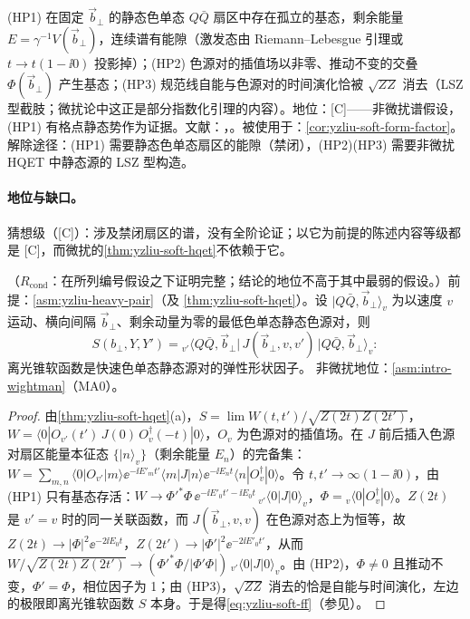 \begin{assumption}\label{asm:yzliu-heavy-pair}
(HP1) 在固定 $\vec b_\perp$ 的静态色单态 $Q\bar Q$ 扇区中存在孤立的基态，剩余能量 $E=\gamma^{-1}V(\vec b_\perp)$，连续谱有能隙（激发态由 Riemann--Lebesgue 引理或 $t\to t(1-\ii0)$ 投影掉）；(HP2) 色源对的插值场以非零、推动不变的交叠 $\Phi(\vec b_\perp)$ 产生基态；(HP3) 规范线自能与色源对的时间演化恰被 $\sqrt{ZZ}$ 消去（LSZ 型截肢；微扰论中这正是部分指数化引理的内容）。地位：[C]——非微扰谱假设，(HP1) 有格点静态势作为证据。文献：\cite{Ji:2019sxk}，\cite[第~4.1--4.2~节、附录~A]{Liu:2022nnk}。被使用于：\cref{cor:yzliu-soft-form-factor}。解除途径：(HP1) 需要静态色单态扇区的能隙（禁闭），(HP2)(HP3) 需要非微扰 HQET 中静态源的 LSZ 型构造。
\end{assumption}

\paragraph{地位与缺口。}猜想级（[C]）：涉及禁闭扇区的谱，没有全阶论证；以它为前提的陈述内容等级都是 [C]，而微扰的\cref{thm:yzliu-soft-hqet}不依赖于它。

\begin{corollary}\label{cor:yzliu-soft-form-factor}
（$R_{\mathrm{cond}}$：在所列编号假设之下证明完整；结论的地位不高于其中最弱的假设。）前提：\cref{asm:yzliu-heavy-pair}（及 \cref{thm:yzliu-soft-hqet}）。设 $|Q\bar Q,\vec b_\perp\rangle_v$ 为以速度 $v$ 运动、横向间隔 $\vec b_\perp$、剩余动量为零的最低色单态静态色源对，则
\begin{equation}\label{eq:yzliu-soft-ff}
S(b_\perp,Y,Y')={}_{v'}\big\langle Q\bar Q,\vec b_\perp\big|\,J(\vec b_\perp,v,v')\,\big|Q\bar Q,\vec b_\perp\big\rangle_v :
\end{equation}
离光锥软函数是快速色单态静态源对的弹性形状因子。%
非微扰地位：\cref{asm:intro-wightman}（MA0）。
\end{corollary}

\begin{proof}
由\cref{thm:yzliu-soft-hqet}(a)，$S=\lim W(t,t')/\sqrt{Z(2t)Z(2t')}$，$W=\langle0|O_{v'}(t')\,J(0)\,O^\dagger_v(-t)|0\rangle$，$O_v$ 为色源对的插值场。在 $J$ 前后插入色源对扇区能量本征态 $\{|n\rangle_v\}$（剩余能量 $E_n$）的完备集：$W=\sum_{m,n}\langle0|O_{v'}|m\rangle\ee^{-\ii E'_mt'}\langle m|J|n\rangle\ee^{-\ii E_nt}\langle n|O_v^\dagger|0\rangle$。令 $t,t'\to\infty(1-\ii0)$，由 (HP1) 只有基态存活：$W\to\Phi'^*\Phi\,\ee^{-\ii E'_0t'-\ii E_0t}\,{}_{v'}\langle0|J|0\rangle_v$，$\Phi={}_v\langle0|O_v^\dagger|0\rangle$。$Z(2t)$ 是 $v'=v$ 时的同一关联函数，而 $J(\vec b_\perp,v,v)$ 在色源对态上为恒等，故 $Z(2t)\to|\Phi|^2\ee^{-2\ii E_0t}$，$Z(2t')\to|\Phi'|^2\ee^{-2\ii E'_0t'}$，从而 $W/\sqrt{Z(2t)Z(2t')}\to(\Phi'^*\Phi/|\Phi'\Phi|)\,{}_{v'}\langle0|J|0\rangle_v$。由 (HP2)，$\Phi\ne0$ 且推动不变，$\Phi'=\Phi$，相位因子为 1；由 (HP3)，$\sqrt{ZZ}$ 消去的恰是自能与时间演化，左边的极限即离光锥软函数 $S$ 本身。于是得\cref{eq:yzliu-soft-ff}（参见\cite[式~(8)、(11)]{Ji:2019sxk}）。
\end{proof}

